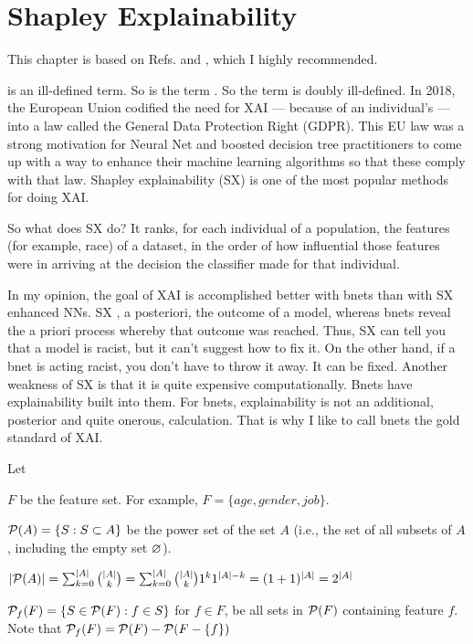 \chapter{Shapley Explainability}

This chapter
is based on 
Refs.\cite{maz-shap-titanic}
and \cite{maz-shap-income},
which I highly recommended.


\label{ch-shapley}
 is an ill-defined term.
So is the term .
So the term  is doubly ill-defined.
In 2018, the European Union codified 
the need for XAI ---
because of an individual’s  ---
into a law called the General Data Protection 
Right (GDPR). This EU law was a strong 
motivation for Neural Net  
and boosted decision tree practitioners 
to come up with a way to enhance  
their machine learning algorithms
so that these comply with that law. Shapley 
explainability (SX) is 
one of the most popular 
methods for doing XAI.

So what does SX do? It ranks, for each individual 
of a population, the features (for example, race)
of a dataset, in the order of how influential those
features were in arriving at the decision the 
classifier made for that individual.

In my opinion, the goal of XAI is 
accomplished better with
bnets
 than with SX enhanced NNs.
SX , a posteriori, the outcome of a model,
whereas bnets reveal the a priori process whereby 
that outcome was reached. Thus, SX can tell you 
that a model is racist, but it can't suggest 
how to fix it. On the other hand, if a bnet 
is acting racist, you don't have to throw it away. 
It can be fixed. 
Another
weakness of SX is that
it is quite expensive
computationally.
Bnets have explainability
built into them.
For bnets, explainability is
not an additional, posterior and quite
onerous, calculation.
That is why I like to call 
bnets the gold standard of XAI.

Let

$F$ be the feature set. For example,
$F=\{age, gender, job\}$. 

${\cal P}(A)=
\{S: S\subset A \}$ be the power 
set of the set $A$ (i.e., the
set of all subsets of $A$, including
the empty set $\varnothing$).

$|{\cal P}(A)|=\sum_{k=0}^{|A|} {|A|\choose k} =
\sum_{k=0}^{|A|} {|A|\choose k}1^k 1^{|A|-k}
= (1+1)^{|A|}=2^{|A|}$


${\cal P}_f(F)=\{S\in {\cal P}(F): f\in S\}$
for $f\in F$, be all sets in ${\cal P}(F)$
containing feature $f$. Note that 
 ${\cal P}_f(F)= {\cal P}(F)-{\cal P}(F-\{f\})$

